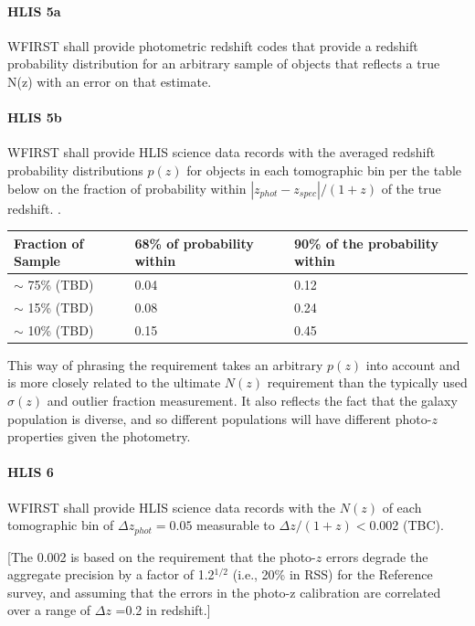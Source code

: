 \paragraph{HLIS 5a} WFIRST shall provide photometric redshift codes that provide a
redshift probability distribution for an arbitrary sample of objects that
reflects a true N(z) with an error on that estimate.

\paragraph{HLIS 5b} WFIRST shall provide HLIS science data records with the
averaged redshift probability distributions $p(z)$ for objects in each tomographic
bin per the table below on the fraction of probability within
$|z_{phot}-z_{spec}|/(1+z)$ of the true redshift. .

\begin{table}[h]
\begin{center}
\begin{tabular}{@{}|l|l|l|@{}}
\hline
Fraction of Sample & 68\% of probability within & 90\% of the probability within\\
\hline
$\sim$ 75\% (TBD) & 0.04 & 0.12\\
$\sim$ 15\% (TBD) & 0.08 & 0.24\\
$\sim$ 10\% (TBD) & 0.15 & 0.45\\
\hline
\end{tabular}
\end{center}
\end{table}
This way of phrasing the requirement takes an arbitrary $p(z)$ into account and
is more closely related to the ultimate $N(z)$ requirement than the typically used
$\sigma(z)$ and outlier fraction measurement.  It also reflects the fact that the galaxy
population is diverse, and so different populations will have different photo-$z$
properties given the photometry.

\paragraph{HLIS 6} WFIRST shall provide HLIS science data records with the $N(z)$ of each
tomographic bin of $\Delta z_{phot}=0.05$ measurable to $\Delta z/(1+z)<$0.002
(TBC).

[The 0.002 is based on the requirement that the photo-$z$ errors degrade the
aggregate precision by a factor of 1.2$^{1/2}$ (i.e., 20\% in RSS) for the Reference
survey, and assuming that the errors in the photo-z calibration are correlated
over a range of $\Delta z$ =0.2 in redshift.]

